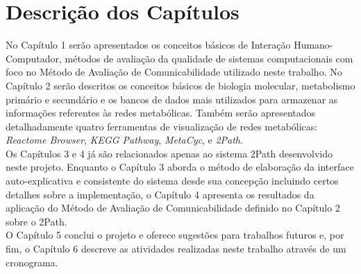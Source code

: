 \section{Descrição dos Capítulos}
\indent No Capítulo 1 serão apresentados os conceitos básicos de Interação Humano-Computador, métodos de avaliação da qualidade de sistemas computacionais com foco no Método de Avaliação de Comunicabilidade utilizado neste trabalho.
\indent No Capítulo 2 serão descritos os conceitos básicos de biologia molecular, metabolismo primário e secundário e os bancos de dados mais utilizados para armazenar as informações referentes às redes metabólicas. Também serão apresentados detalhadamente quatro ferramentas de visualização de redes metabólicas: \textit{Reactome Browser}, \textit{KEGG Pathway}, \textit{MetaCyc}, e \textit{2Path}. \\ 
\indent Os Capítulos 3 e 4 já são relacionados apenas ao sistema 2Path desenvolvido neste projeto. Enquanto o Capítulo 3 aborda o método de elaboração da interface auto-explicativa e consistente do sistema desde sua concepção incluindo certos detalhes sobre a implementação, o Capítulo 4 apresenta os resultados da aplicação do Método de Avaliação de Comunicabilidade definido no Capítulo 2 sobre o 2Path. \\
\indent O Capítulo 5  conclui o projeto e oferece sugestões para trabalhos futuros e, por fim, o Capítulo 6 descreve as atividades realizadas neste trabalho através de um cronograma.